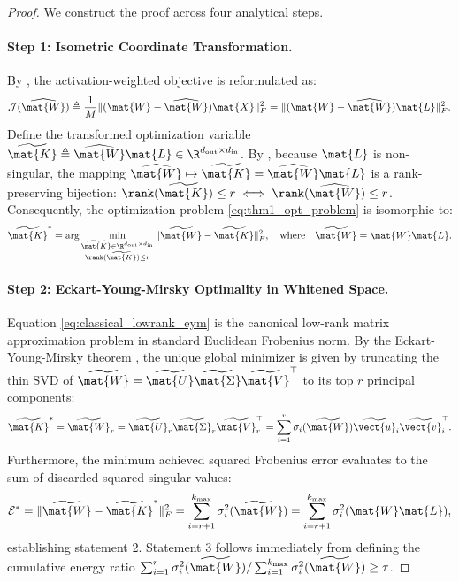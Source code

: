 \begin{proof}
We construct the proof across four analytical steps.

\paragraph{Step 1: Isometric Coordinate Transformation.}
By , the activation-weighted objective is reformulated as:
\begin{equation}
\mathcal{J}(\widehat{\mat{W}}) \triangleq \frac{1}{M} \| (\mat{W} - \widehat{\mat{W}}) \mat{X} \|_F^2 = \| (\mat{W} - \widehat{\mat{W}}) \mat{L} \|_F^2.
\end{equation}
Define the transformed optimization variable $\widetilde{\mat{K}} \triangleq \widehat{\mat{W}} \mat{L} \in \R^{d_{\text{out}} \times d_{\text{in}}}$. By , because $\mat{L}$ is non-singular, the mapping $\widehat{\mat{W}} \mapsto \widetilde{\mat{K}} = \widehat{\mat{W}} \mat{L}$ is a rank-preserving bijection: $\rank(\widetilde{\mat{K}}) \le r \iff \rank(\widehat{\mat{W}}) \le r$. Consequently, the optimization problem \eqref{eq:thm1_opt_problem} is isomorphic to:
\begin{equation}
\widetilde{\mat{K}}^* = \arg\min_{\substack{\widetilde{\mat{K}} \in \R^{d_{\text{out}} \times d_{\text{in}}} \\ \rank(\widetilde{\mat{K}}) \le r}} \| \widetilde{\mat{W}} - \widetilde{\mat{K}} \|_F^2, \quad \text{where} \quad \widetilde{\mat{W}} = \mat{W} \mat{L}.
\label{eq:classical_lowrank_eym}
\end{equation}

\paragraph{Step 2: Eckart-Young-Mirsky Optimality in Whitened Space.}
Equation \eqref{eq:classical_lowrank_eym} is the canonical low-rank matrix approximation problem in standard Euclidean Frobenius norm. By the Eckart-Young-Mirsky theorem \cite{eckart1936approximation,golub2013matrix}, the unique global minimizer is given by truncating the thin SVD of $\widetilde{\mat{W}} = \widetilde{\mat{U}} \widetilde{\mat{\Sigma}} \widetilde{\mat{V}}^\top$ to its top $r$ principal components:
\begin{equation}
\widetilde{\mat{K}}^* = \widetilde{\mat{W}}_r = \widetilde{\mat{U}}_r \widetilde{\mat{\Sigma}}_r \widetilde{\mat{V}}_r^\top = \sum_{i=1}^r \sigma_i(\widetilde{\mat{W}}) \widetilde{\vect{u}}_i \widetilde{\vect{v}}_i^\top.
\end{equation}
Furthermore, the minimum achieved squared Frobenius error evaluates to the sum of discarded squared singular values:
\begin{equation}
\mathcal{E}^* = \| \widetilde{\mat{W}} - \widetilde{\mat{K}}^* \|_F^2 = \sum_{i=r+1}^{k_{\max}} \sigma_i^2(\widetilde{\mat{W}}) = \sum_{i=r+1}^{k_{\max}} \sigma_i^2(\mat{W} \mat{L}),
\end{equation}
establishing statement 2. Statement 3 follows immediately from defining the cumulative energy ratio $\sum_{i=1}^r \sigma_i^2(\widetilde{\mat{W}}) / \sum_{i=1}^{k_{\max}} \sigma_i^2(\widetilde{\mat{W}}) \ge \tau$.


\end{proof}
